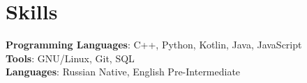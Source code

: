 \section{Skills}
 \begin{itemize}[leftmargin=0.15in, label={}]
    \small{\item{
     \textbf{Programming Languages}{: C++, Python, Kotlin, Java, JavaScript} \\
     \textbf{Tools}{: GNU/Linux, Git, SQL} \\
     \textbf{Languages}{: Russian Native, English Pre-Intermediate} \\
    }}
 \end{itemize}
 \vspace{-16pt}